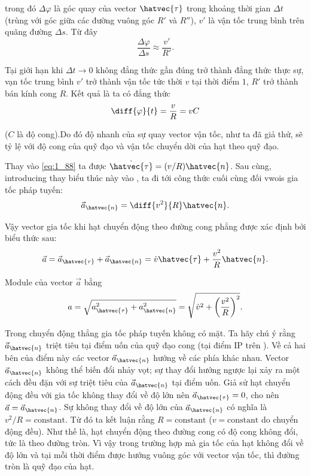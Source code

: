 \noindent
trong đó $\Delta\varphi$ là góc quay của vector $\hatvec{\tau}$ trong khoảng thời gian $\Delta t$ (trùng với góc giữa các đường vuông góc $R'$ và $R''$), $v'$ là vận tốc trung bình trên quãng đường $\Delta s$. Từ đây
\begin{equation*}
\frac{\Delta\varphi}{\Delta s} \approx \frac{v'}{R'}.
\end{equation*}

\noindent
Tại giới hạn khi $\Delta t\to 0$ không đẳng thức gần đúng trở thành đẳng thức thực sự, vạn tốc trung bình $v'$ trở thành vận tốc tức thời $v$ tại thời điểm $1$, $R'$ trở thành bán kính cong $R$. Kết quả là ta có đẳng thức
\begin{equation}\label{eq:1_89}
\diff{\varphi}{t} = \frac{v}{R} = vC
\end{equation}

\noindent
($C$ là độ cong).Do đó độ nhanh của sự quay vector vận tốc, như ta đã giả thử, sẽ tỷ lệ với độ cong của quỹ đạo và vận tốc chuyển dời của hạt theo quỹ đạo.

Thay  vào \eqref{eq:1_88} ta được $\dot{\hatvec{\tau}}=(v/R)\hatvec{n}$. Sau cùng, introducing thay biểu thúc này vào , ta đi tới công thức cuối cùng đối vwois gia tốc pháp tuyến:
\begin{equation}\label{eq:1_90}
\vec{a}_{\hatvec{n}} = \diff{v^2}{R}\hatvec{n}.
\end{equation}

Vậy vector gia tốc khi hạt chuyển động theo đường cong phẳng được xác định bởi biểu thức sau:
\begin{equation}\label{eq:1_91}
\vec{a} = \vec{a}_{\hatvec{\tau}} + \vec{a}_{\hatvec{n}} = \dot{v}\hatvec{\tau} + \frac{v^2}{R}\hatvec{n}.
\end{equation}

\noindent
Module của vector $\vec{a}$ bằng
\begin{equation}\label{eq:1_92}
a = \sqrt{a_{\hatvec{\tau}}^2 + a_{\hatvec{n}}^2} = \sqrt{\dot{v}^2 + \left(\frac{v^2}{R}\right)^2}.
\end{equation}

Trong chuyển động thẳng gia tốc pháp tuyến không có mặt. Ta hãy chú ý rằng $\vec{a}_{\hatvec{n}}$ triệt tiêu tại điểm uốn của quỹ đạo cong (tại điểm IP trên ). Về cả hai bên của điểm này các vector $\vec{a}_{\hatvec{n}}$ hướng về các phía khác nhau. Vector $\vec{a}_{\hatvec{n}}$ không thể biến đổi nhảy vọt; sự thay đổi hướng ngược lại xảy ra một cách đều đặn với sự triệt tiêu của $\vec{a}_{\hatvec{n}}$ tại điểm uốn. Giả sử hạt chuyển động đều với gia tốc không thay đổi về độ lớn nên $\vec{a}_{\hatvec{\tau}}=0$, cho nên $\vec{a}=\vec{a}_{\hatvec{n}}$. Sự không thay đổi về độ lớn của $\vec{a}_{\hatvec{n}}$ có nghĩa là $v^2/R=\text{constant}$. Từ đó ta kết luận rằng $R=\text{constant}$ ($v=\text{constant}$ do chuyển động đều). Như thế là, hạt chuyển động theo đường cong có độ cong không đổi, tức là theo đường tròn. Vì vậy trong trường hợp mà gia tốc của hạt không đổi về độ lớn và tại mỗi thời điểm được hướng vuông góc với vector vận tốc, thì đường tròn là quỹ đạo của hạt.

